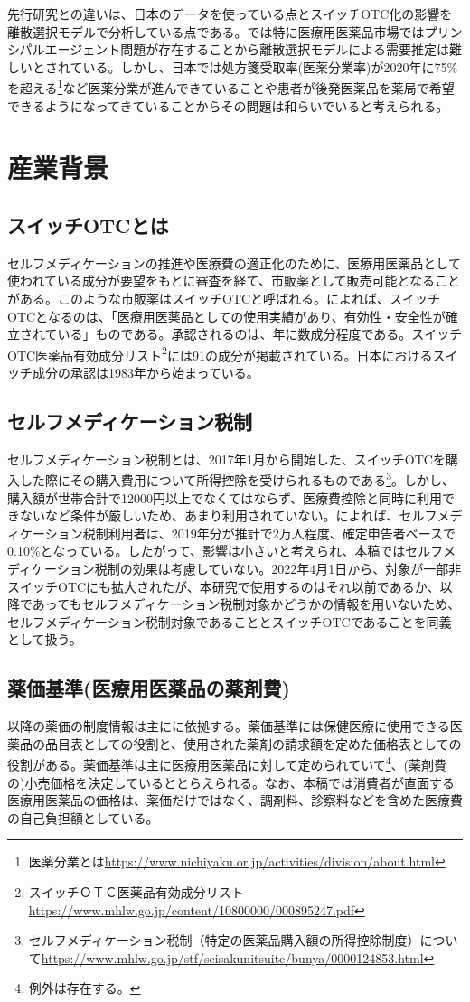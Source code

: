 \documentclass[a4paper,11pt,uplatex]{jsarticle}
\theoremstyle{definition}
\begin{document}
先行研究との違いは、日本のデータを使っている点とスイッチOTC化の影響を離散選択モデルで分析している点である。\cite{JLE2002}では特に医療用医薬品市場ではプリンシパルエージェント問題が存在することから離散選択モデルによる需要推定は難しいとされている。しかし、日本では処方箋受取率(医薬分業率)が2020年に75\%を超える\footnote{医薬分業とは\url{https://www.nichiyaku.or.jp/activities/division/about.html}}など医薬分業が進んできていることや患者が後発医薬品を薬局で希望できるようになってきていることからその問題は和らいでいると考えられる。
\section{産業背景}
\subsection{スイッチOTCとは}
セルフメディケーションの推進や医療費の適正化のために、医療用医薬品として使われている成分が要望をもとに審査を経て、市販薬として販売可能となることがある。このような市販薬はスイッチOTCと呼ばれる。\cite{jmsi2020}によれば、スイッチOTCとなるのは、「医療用医薬品としての使用実績があり、有効性・安全性が確立されている」ものである。承認されるのは、年に数成分程度である。スイッチOTC医薬品有効成分リスト\footnote{スイッチＯＴＣ医薬品有効成分リスト\url{https://www.mhlw.go.jp/content/10800000/000895247.pdf}}には91の成分が掲載されている。日本におけるスイッチ成分の承認は1983年から始まっている。
\subsection{セルフメディケーション税制}
セルフメディケーション税制とは、2017年1月から開始した、スイッチOTCを購入した際にその購入費用について所得控除を受けられるものである\footnote{セルフメディケーション税制（特定の医薬品購入額の所得控除制度）について\url{https://www.mhlw.go.jp/stf/seisakunitsuite/bunya/0000124853.html}}。しかし、購入額が世帯合計で12000円以上でなくてはならず、医療費控除と同時に利用できないなど条件が厳しいため、あまり利用されていない。\cite{jmsi2021}によれば、セルフメディケーション税制利用者は、2019年分が推計で2万人程度、確定申告者ベースで0.10\%となっている。したがって、影響は小さいと考えられ、本稿ではセルフメディケーション税制の効果は考慮していない。2022年4月1日から、対象が一部非スイッチOTCにも拡大されたが、本研究で使用するのはそれ以前であるか、以降であってもセルフメディケーション税制対象かどうかの情報を用いないため、セルフメディケーション税制対象であることとスイッチOTCであることを同義として扱う。
\subsection{薬価基準(医療用医薬品の薬剤費)}
以降の薬価の制度情報は主に\cite{takahashi}に依拠する。薬価基準には保健医療に使用できる医薬品の品目表としての役割と、使用された薬剤の請求額を定めた価格表としての役割がある。薬価基準は主に医療用医薬品に対して定められていて\footnote{例外は存在する。}、(薬剤費の)小売価格を決定しているととらえられる。なお、本稿では消費者が直面する医療用医薬品の価格は、薬価だけではなく、調剤料、診察料などを含めた医療費の自己負担額としている。
\end{document}
